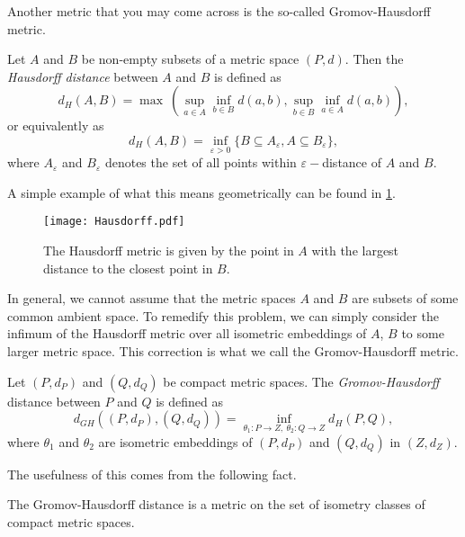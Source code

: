 Another metric that you may come across is the so-called Gromov-Hausdorff metric.
\begin{definition}
  Let $A$ and $B$ be non-empty subsets of a metric space $(P, d)$. Then the \textit{Hausdorff distance} between $A$ and $B$ is defined as
  \begin{equation*}
    d_{H}(A, B) = \max\:\left(\sup_{a \in A} \inf_{b \in B} d(a,b), \sup_{b \in B} \inf_{a \in A} d(a,b) \right),
  \end{equation*}
  or equivalently as
  \begin{equation*}
    d_{H}(A, B) = \inf_{\varepsilon > 0}\{B \subseteq A_{\varepsilon}, A \subseteq B_{\varepsilon}\},
  \end{equation*}
  where $A_{\varepsilon}$ and $B_{\varepsilon}$ denotes the set of all points within $\varepsilon-$distance of $A$ and $B$.
\end{definition}
A simple example of what this means geometrically can be found in \ref{fig:hausdorff}.

\begin{figure}[h!]
  \centering
  \texttt{[image: Hausdorff.pdf]}
  \caption{The Hausdorff metric is given by the point in $A$ with the largest distance to the closest point in $B$.}
  \label{fig:hausdorff}
\end{figure}

In general, we cannot assume that the metric spaces $A$ and $B$ are subsets of some common ambient space. To remedify this problem, we can simply consider the infimum of the Hausdorff metric over all isometric embeddings of $A$, $B$ to some larger metric space. This correction is what we call the Gromov-Hausdorff metric.

\begin{definition}
  Let $(P, d_{P})$ and $(Q, d_{Q})$ be compact metric spaces. The \textit{Gromov-Hausdorff} distance between $P$ and $Q$ is defined as
  \begin{equation*}
    d_{GH}((P, d_{P}), (Q, d_{Q})) = \inf_{\theta_{1}: P \to Z, \: \theta_{2}: Q \to Z}d_{H}(P, Q),
  \end{equation*}
  where $\theta_{1}$ and $\theta_{2}$ are isometric embeddings of $(P, d_{P})$ and $(Q, d_{Q})$ in $(Z, d_{Z})$.
\end{definition}

The usefulness of this comes from the following fact.
\begin{theorem}
  The Gromov-Hausdorff distance is a metric on the set of isometry classes of compact metric spaces.
\end{theorem}

